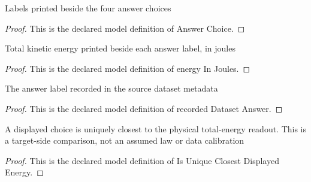 \begin{definition}
  \label{def:physics:phyx-mini-0551:phyxminiproblems-problemphyxmini0551-answerchoice}
  Labels printed beside the four answer choices
\end{definition}
\begin{proof}
  This is the declared model definition of Answer Choice.
\end{proof}
\begin{definition}
  \label{def:physics:phyx-mini-0551:phyxminiproblems-problemphyxmini0551-answerchoice-energyinjoules}
  Total kinetic energy printed beside each answer label, in joules
\end{definition}
\begin{proof}
  This is the declared model definition of energy In Joules.
\end{proof}
\begin{definition}
  \label{def:physics:phyx-mini-0551:phyxminiproblems-problemphyxmini0551-recordeddatasetanswer}
  The answer label recorded in the source dataset metadata
\end{definition}
\begin{proof}
  This is the declared model definition of recorded Dataset Answer.
\end{proof}
\begin{definition}
  \label{def:physics:phyx-mini-0551:phyxminiproblems-problemphyxmini0551-isuniqueclosestdisplayedenergy}
  A displayed choice is uniquely closest to the physical total-energy readout. This is a target-side comparison, not an assumed law or data calibration
\end{definition}
\begin{proof}
  This is the declared model definition of Is Unique Closest Displayed Energy.
\end{proof}
